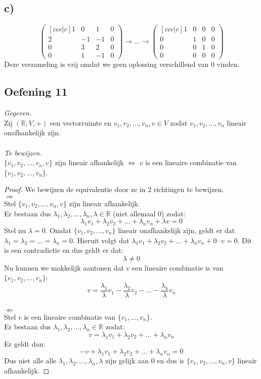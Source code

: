 \documentclass[lineaire_algebra_oplossingen.tex]{subfiles}
\begin{document}
\subsection*{c)}
\[
\begin{pmatrix}[ccc|c]
1 &  0 &  1 & 0 \\
2 & -1 & -1 & 0 \\
0 &  3 &  2 & 0 \\
0 &  1 & -1 & 0
\end{pmatrix}
\longrightarrow
\dots
\longrightarrow
\begin{pmatrix}[ccc|c]
1 & 0 & 0 & 0 \\
0 & 1 & 0 & 0 \\
0 & 0 & 1 & 0 \\
0 & 0 & 0 & 0
\end{pmatrix}
\]
Deze verzameling is vrij omdat we geen oplossing verschillend van 0 vinden.

\subsection{Oefening 11}
\textit{Gegeven.}\\
Zij $(\mathbb{R},V,+)$ een vectorruimte en $v_1,v_2,\ldots,v_n,v \in V$ zodat $v_1,v_2,\ldots,v_n$ lineair onafhankelijk zijn.\\\\
\textit{Te bewijzen.}\\
$\{v_1, v_2, \ldots, v_n, v\}$ zijn lineair afhankelijk $\Longleftrightarrow$ $v$ is een lineaire combinatie van $\{v_1,v_2,\ldots,v_n\}$.\\
\begin{proof} We bewijzen de equivalentie door ze in 2 richtingen te bewijzen.\\
$\Longrightarrow$\\
Stel $\{ v_1, v_2,\ldots, v_n, v \}$ zijn lineair afhankelijk.\\
Er bestaan dus $\lambda_1, \lambda_2,\ldots, \lambda_n, \lambda \in \mathbb{R}$ (niet allemaal 0) zodat:
\[ \lambda_1 v_1 + \lambda_2 v_2 +  \ldots + \lambda_n v_n + \lambda v = 0\]
Stel nu $\lambda = 0$. Omdat $\{v_1,v_2,\ldots,v_n\}$ lineair onafhankelijk zijn, geldt er dat $\lambda_1 = \lambda_2 = \ldots = \lambda_n = 0$. Hieruit volgt dat $\lambda_1 v_1 + \lambda_2 v_2 + \ldots + \lambda_n v_n + 0 \cdot v = 0$. Dit is een contradictie en dus geldt er dat:
\[
\lambda \neq 0
\]
Nu kunnen we makkelijk aantonen dat $v$ een lineaire combinatie is van $\{v_1,v_2,\ldots,v_n\}$:
\[
v = \frac{\lambda_1}{\lambda}v_1 - \frac{\lambda_2}{\lambda}v_2 - \ldots - \frac{\lambda_n}{\lambda}v_n
\]\\
$\Longleftarrow$\\
Stel $v$ is een lineaire combinatie van $\{v_1,\ldots,v_n\}$.\\
Er bestaan dus $\lambda_1, \lambda_2,\ldots, \lambda_n \in \mathbb{R}$ zodat:
\[
v = \lambda_1 v_1 + \lambda_2 v_2 +  \ldots + \lambda_n v_n
\]
Er geldt dan:
\[
-v + \lambda_1 v_1 + \lambda_2 v_2 +  \ldots + \lambda_n v_n = 0
\]
Dus niet alle alle $\lambda_1, \lambda_2,\ldots, \lambda_n, \lambda$ zijn gelijk aan 0 en dus is $\{v_1, v_2, \ldots, v_n, v\}$ lineair afhankelijk.
\end{proof}
 
\end{document}

